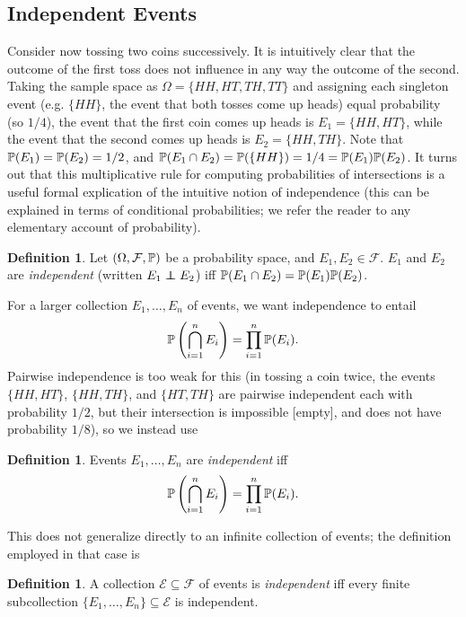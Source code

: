 \documentclass{article}
\theoremstyle{definition}
\newtheorem{definition}[theorem]{Definition}
\newcommand\indep{\protect\mathpalette{\protect\independenT}{\perp}}
\def\independenT#1#2{\mathrel{\rlap{$#1#2$}\mkern2mu{#1#2}}}
\begin{document}
\subsection{Independent Events}

Consider now tossing two coins successively. It is intuitively clear that the outcome of the first toss does not influence in any way the outcome of the second. Taking the sample space as $\Omega = \{HH, HT, TH, TT\}$ and assigning each singleton event (e.g. $\{HH\}$, the event that both tosses come up heads) equal probability (so $1/4$), the event that the first coin comes up heads is $E_1 = \{HH, HT\}$, while the event that the second comes up heads is $E_2 = \{HH, TH\}$. Note that $\P(E_1) = \P(E_2) = 1/2$, and $\P(E_1 \cap E_2) = \P(\{HH\}) = 1/4 = \P(E_1) \P(E_2)$. It turns out that this multiplicative rule for computing probabilities of intersections is a useful formal explication of the intuitive notion of independence (this can be explained in terms of conditional probabilities; we refer the reader to any elementary account of probability).

\begin{definition}
Let $(\Omega, \mathcal F, \P)$ be a probability space, and $E_1, E_2 \in \mathcal F$. $E_1$ and $E_2$ are {\em independent} (written $E_1 \indep E_2$) iff $\P(E_1 \cap E_2) = \P(E_1) \P(E_2)$.
\end{definition}

For a larger collection $E_1, \ldots, E_n$ of events, we want independence to entail
\[ \P\left(\bigcap_{i=1}^n E_i\right) = \prod_{i=1}^n \P(E_i). \]
Pairwise independence is too weak for this (in tossing a coin twice, the events $\{HH,HT\}$, $\{HH,TH\}$, and $\{HT,TH\}$ are pairwise independent each with probability $1/2$, but their intersection is impossible [empty], and does not have probability $1/8$), so we instead use

\begin{definition}
Events $E_1, \ldots, E_n$ are {\em independent} iff
\[ \P\left(\bigcap_{i=1}^n E_i\right) = \prod_{i=1}^n \P(E_i). \]
\end{definition}

This does not generalize directly to an infinite collection of events; the definition employed in that case is

\begin{definition}
A collection $\mathcal E \subseteq \mathcal F$ of events is {\em independent} iff every finite subcollection $\{E_1, \ldots, E_n\} \subseteq \mathcal E$ is independent.
\end{definition}
\end{document}
